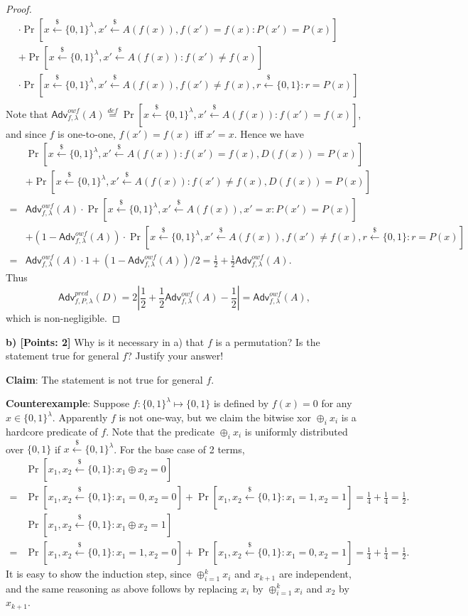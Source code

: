 \documentclass[12pt]{article}
\newcommand{\eqdef}{\stackrel{def}{=}}
\newcommand{\bits}{\{0,1\}}
\newcommand{\getsr}{\stackrel{\$}{\gets}}
\newcommand{\Adv}{\textsf{Adv}}
\theoremstyle{definition}
\begin{document}
\begin{proof}
$$\begin{aligned}
&\cdot\Pr[x\getsr\bits^\lambda, x'\getsr A(f(x)), f(x')=f(x): P(x') = P(x)] \\
&+\Pr[x\getsr\bits^\lambda, x'\getsr A(f(x)) : f(x')\not=f(x)]\\
&\cdot\Pr[x\getsr\bits^\lambda, x'\getsr A(f(x)), f(x')\not=f(x), r\getsr\bits: r = P(x)] \\
\end{aligned}
$$
Note that $\Adv_{f,\lambda}^{owf}(A) \eqdef \Pr[x\getsr\bits^\lambda, x'\getsr A(f(x)) : f(x')=f(x)]$, and since $f$ is one-to-one, $f(x')=f(x)$ iff $x'=x$. Hence we have
$$
\begin{aligned}
&\Pr[x\getsr\bits^\lambda, x'\getsr A(f(x)) : f(x')=f(x), D(f(x)) = P(x)] \\
&+\Pr[x\getsr\bits^\lambda, x'\getsr A(f(x)) : f(x')\not=f(x), D(f(x)) = P(x)] \\
=&\Adv_{f,\lambda}^{owf}(A)\cdot\Pr[x\getsr\bits^\lambda, x'\getsr A(f(x)), x'=x: P(x') = P(x)] \\
&+(1-\Adv_{f,\lambda}^{owf}(A))\cdot\Pr[x\getsr\bits^\lambda, x'\getsr A(f(x)), f(x')\not=f(x), r\getsr\bits: r = P(x)] \\
=&\Adv_{f,\lambda}^{owf}(A)\cdot 1 + (1-\Adv_{f,\lambda}^{owf}(A))/2 = \frac{1}{2} + \frac{1}{2}\Adv_{f,\lambda}^{owf}(A).
\end{aligned}
$$
Thus
$$\Adv_{f,P,\lambda}^{pred}(D) = 2\left| \frac{1}{2} + \frac{1}{2}\Adv_{f,\lambda}^{owf}(A)-\frac{1}{2} \right| = \Adv_{f,\lambda}^{owf}(A),$$
which is non-negligible.
\end{proof}

{\bf b) [Points: 2]} Why is it necessary in a) that $f$ is a permutation? Is the statement true for
general $f$? Justify your answer!

{\bf Claim}: The statement is not true for general $f$.

{\bf Counterexample}: Suppose $f : \bits^\lambda \mapsto \bits$ is defined by $f(x) = 0$ for any $x\in\bits^\lambda$. Apparently $f$ is not one-way, but we claim the bitwise xor $\oplus_i x_i$ is a hardcore predicate of $f$. Note that the predicate $\oplus_i x_i$ is uniformly distributed over $\bits$ if $x\getsr\bits^\lambda$. For the base case of 2 terms, 
$$\begin{aligned}
&\Pr[x_1,x_2\getsr\bits: x_1\oplus x_2 = 0] \\
= &\Pr[x_1,x_2\getsr\bits: x_1 = 0, x_2=0] + \Pr[x_1,x_2\getsr\bits: x_1 = 1, x_2=1] = \frac{1}{4} + \frac{1}{4} = \frac{1}{2}.
\end{aligned}$$ 
$$\begin{aligned}
&\Pr[x_1,x_2\getsr\bits: x_1\oplus x_2 = 1] \\
= &\Pr[x_1,x_2\getsr\bits: x_1 = 1, x_2=0] + \Pr[x_1,x_2\getsr\bits: x_1 = 0, x_2=1] = \frac{1}{4} + \frac{1}{4} = \frac{1}{2}.
\end{aligned}$$ 
It is easy to show the induction step, since $\oplus_{i=1}^k x_i$ and $x_{k+1}$ are independent, and the same reasoning as above follows by replacing $x_i$ by $\oplus_{i=1}^k x_i$ and $x_2$ by $x_{k+1}$.
\end{document}
